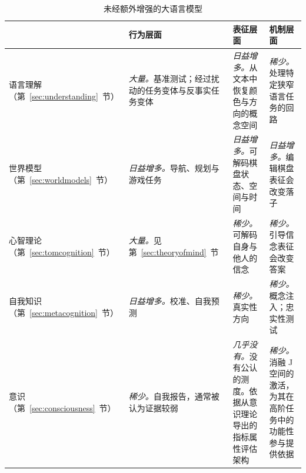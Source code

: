 \begin{table}
\footnotesize
\begin{subtable}{\textwidth}
\begin{tabularx}{\linewidth}{@{}p{2.1cm}XXX@{}}
\toprule
 & \textbf{行为层面} & \textbf{表征层面} & \textbf{机制层面} \\
\midrule
语言理解（第~\ref{sec:understanding}~节） &
\emph{大量。}基准测试；经过扰动的任务变体与反事实任务变体 \citep{wu2024reasoning} &
\emph{日益增多。}从文本中恢复颜色与方向的概念空间 \citep{abdou2021language, patel2022mapping} &
\emph{稀少。}处理特定狭窄语言任务的回路 \citep{wang2022interpretability} \\
\addlinespace
世界模型（第~\ref{sec:worldmodels}~节） &
\emph{日益增多。}导航、规划与游戏任务 \citep{momennejad2023cogeval, paglieri2024balrog} &
\emph{日益增多。}可解码棋盘状态、空间与时间 \citep{li2023emergent, gurnee2024language} &
\emph{日益增多。}编辑棋盘表征会改变落子 \citep{li2023emergent, nanda2023emergent} \\
\addlinespace
心智理论（第~\ref{sec:tomcognition}~节） &
\emph{大量。}见第~\ref{sec:theoryofmind}~节 &
\emph{稀少。}可解码自身与他人的信念 \citep{zhu2024language, bortoletto2024benchmarking} &
\emph{稀少。}引导信念表征会改变答案 \citep{zhu2024language} \\
\addlinespace
自我知识（第~\ref{sec:metacognition}~节） &
\emph{日益增多。}校准、自我预测 \citep{kadavath2022language, binder2024looking} &
\emph{稀少。}真实性方向 \citep{azaria2023internal, burns2023discovering} &
\emph{稀少。}概念注入；忠实性测试 \citep{lindsey2025introspection, turpin2023language} \\
\addlinespace
意识（第~\ref{sec:consciousness}~节） &
\emph{稀少。}自我报告，通常被认为证据较弱 \citep{perez2023towards} &
\emph{几乎没有。}没有公认的测度。依据从意识理论导出的指标属性评估架构 \citep{butlin2023consciousness} &
\emph{稀少。}消融 J 空间的激活，为其在高阶任务中的功能性参与提供依据 \citep{gurnee2026verbalize}\\
\bottomrule
\end{tabularx}
\caption{未经额外增强的大语言模型}\label{tab:levels-bare}
\end{subtable}

\bigskip


\end{table}
